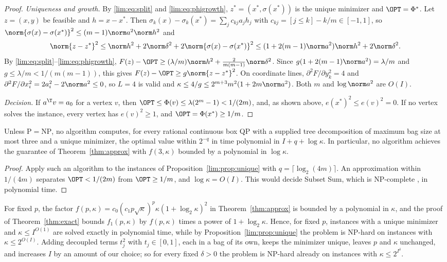 \begin{proof}
\emph{Uniqueness and growth.} By \eqref{lim:eq:split} and
\eqref{lim:eq:phigrowth}, $z^*=(x^*,\sigma(x^*))$ is the unique minimizer
and $\OPT=\Phi^*$. Let $z=(x,y)$ be feasible and $h=x-x^*$. Then
$\sigma_k(x)-\sigma_k(x^*)=\sum_jc_{kj}a_jh_j$ with
$c_{kj}=[j\le k]-k/m\in[-1,1]$, so
$\norm{\sigma(x)-\sigma(x^*)}^2\le(m-1)\norm a^2\norm h^2$ and
\[
\norm{z-z^*}^2\le\norm h^2+2\norm\delta^2+2\norm{\sigma(x)-\sigma(x^*)}^2
\le(1+2(m-1)\norm a^2)\norm h^2+2\norm\delta^2 .
\]
By \eqref{lim:eq:split}--\eqref{lim:eq:phigrowth},
$F(z)-\OPT\ge(\lambda/m)\norm h^2+\frac2{m(m-1)}\norm\delta^2$. Since
$g(1+2(m-1)\norm a^2)=\lambda/m$ and $g\le\lambda/m<1/(m(m-1))$, this gives
$F(z)-\OPT\ge g\norm{z-z^*}^2$. On coordinate lines,
$\partial^2F/\partial y_k^2=4$ and
$\partial^2F/\partial x_i^2=2a_i^2-2\norm a^2\le0$, so $L=4$ is valid and
$\kappa\le4/g\le2^{m+3}m^2(1+2m\norm a^2)$. Both $m$ and $\log\norm a^2$ are
$O(I)$.

\emph{Decision.} If $a^{\T}v=a_0$ for a vertex $v$, then
$\OPT\le\Phi(v)\le\lambda(2^m-1)<1/(2m)$, and, as shown above,
$e(x^*)^2\le e(v)^2=0$. If no vertex solves the instance, every vertex has
$e(v)^2\ge1$, and $\OPT=\Phi(x^*)\ge1/m$.
\end{proof}

\begin{corollary}
\label{lim:cor:nopolylog}
Unless $\mathrm P=\mathrm{NP}$, no algorithm computes, for every rational
continuous box QP with a supplied tree decomposition of maximum bag size at
most three and a unique minimizer, the optimal value within $2^{-q}$ in time
polynomial in $I+q+\log\kappa$. In particular, no algorithm achieves the
guarantee of Theorem~\ref{thm:approx} with $f(3,\kappa)$ bounded by a
polynomial in $\log\kappa$.
\end{corollary}

\begin{proof}
Apply such an algorithm to the instances of
Proposition~\ref{lim:prop:unique} with $q=\lceil\log_2(4m)\rceil$. An
approximation within $1/(4m)$ separates $\OPT<1/(2m)$ from $\OPT\ge1/m$,
and $\log\kappa=O(I)$. This would decide Subset Sum, which is NP-complete
\cite{GareyJohnson1979}, in polynomial time.
\end{proof}

For fixed $p$, the factor
$f(p,\kappa)=c_0(c_1p\sqrt\kappa)^p\kappa(1+\log_2\kappa)^2$ in
Theorem~\ref{thm:approx} is bounded by a polynomial in $\kappa$, and the proof
of Theorem~\ref{thm:exact} bounds $f_1(p,\kappa)$ by $f(p,\kappa)$ times a
power of $1+\log_2\kappa$. Hence, for fixed $p$, instances with a unique
minimizer and $\kappa\le I^{O(1)}$ are solved exactly in polynomial time,
while by Proposition~\ref{lim:prop:unique} the problem is NP-hard on
instances with $\kappa\le2^{O(I)}$. Adding decoupled terms $t_j^2$ with
$t_j\in[0,1]$, each in a bag of its own, keeps the minimizer unique, leaves
$p$ and $\kappa$ unchanged, and increases $I$ by an amount of our choice; so
for every fixed $\delta>0$ the problem is NP-hard already on instances with
$\kappa\le2^{I^\delta}$.

